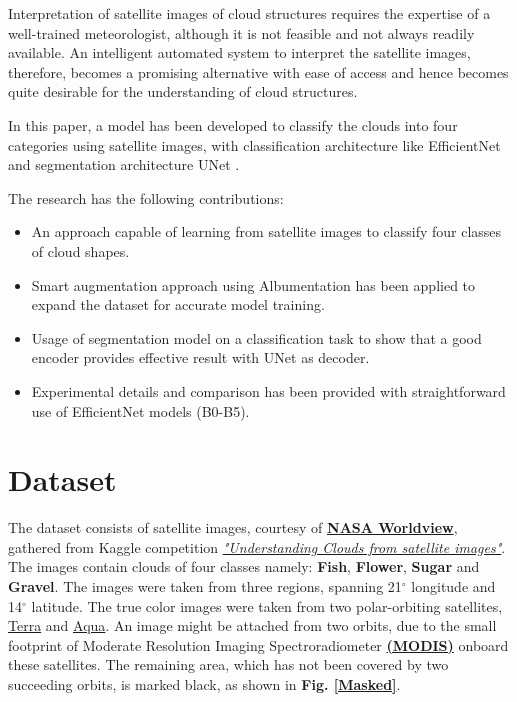 \documentclass[conference]{IEEEtran}
\begin{document}
Interpretation of satellite images of cloud structures requires the expertise of a well-trained meteorologist, although it is not feasible and not always readily available. An intelligent automated system to interpret the satellite images, therefore, becomes a promising alternative with ease of access and hence becomes quite desirable for the understanding of cloud structures. 

In this paper, a model has been developed to classify the clouds into four categories using satellite images, with classification architecture like EfficientNet and segmentation architecture UNet \cite{tan2019efficientnet,ronneberger2015u}.

The research has the following contributions:
\begin{itemize}
    \item An approach capable of learning from satellite images to classify four classes of cloud shapes.
    \item Smart augmentation approach using Albumentation has been applied to expand the dataset for accurate model training.
    \item Usage of segmentation model on a classification task to show that a good encoder provides effective result with UNet as decoder.
    \item Experimental details and comparison has been provided with straightforward use of EfficientNet models (B0-B5).
\end{itemize}











\section{Dataset \label{dataset}}

The dataset consists of satellite images, courtesy of \href{https://worldview.earthdata.nasa.gov/}{ \textbf{NASA Worldview}}, gathered from Kaggle competition \href{https://www.kaggle.com/c/understanding_cloud_organization/data}{\textit{"Understanding Clouds from satellite images"}}. The images contain clouds of four classes namely: \textbf{Fish}, \textbf{Flower}, \textbf{Sugar} and \textbf{Gravel}. The images were taken from three regions, spanning 21$^\circ$ longitude and 14$^\circ$ latitude. The true color images were taken from two polar-orbiting satellites, \href{https://en.wikipedia.org/wiki/Terra_(satellite)}{Terra} and \href{https://en.wikipedia.org/wiki/Aqua_(satellite)}{Aqua}. An image might be attached from two orbits, due to the small footprint of Moderate Resolution Imaging Spectroradiometer \href{https://modis.gsfc.nasa.gov/}{\textbf{(MODIS)}} onboard these satellites. The remaining area, which has not been covered by two succeeding orbits, is marked black, as shown in \textbf{Fig. \ref{Masked}}.
\end{document}
